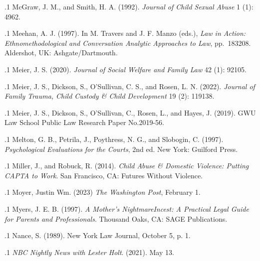 \documentclass[11pt, twoside]{article}
\begin{document}
{\p.1{%
McGraw, J. M., and Smith, H. A. (1992). 
\textit{Journal of Child Sexual Abuse} 1 (1): 49\ndash{}62.
}%

\p.1{%
Meehan, A. J. (1997).  In
M. Travers and J. F. Manzo (eds.), \textit{Law in Action: Ethnomethodological and
Conversation Analytic Approaches to Law}, pp.~183\ndash{}208. Aldershot, UK: Ashgate/Dartmouth.
}%

\p.1{%
Meier, J. S. (2020).  \textit{Journal of Social Welfare
and Family Law} 42 (1): 92\ndash{}105.
}%

\p.1{%
Meier, J. S., Dickson, S., O’Sullivan, C. S., and Rosen, L. N. (2022).  \textit{Journal of Family
Trauma, Child Custody \& Child Development} 19 (2): 119\ndash{}138.
}%

\p.1{%
Meier, J. S., Dickson, S., O’Sullivan, C., Rosen, L., and Hayes, J. (2019).  GWU
Law School Public Law Research Paper No.\@ 2019-56.
}%

\p.1{%
Melton, G. B., Petrila, J., Poythress, N. G., and Slobogin, C. (1997). \textit{Psychological
Evaluations for the Courts}, 2nd ed. New York: Guilford Press.
}%

\p.1{%
Miller, J., and Robuck, R. (2014). \textit{Child Abuse \& Domestic Violence: Putting CAPTA
to Work}. San Francisco, CA: Futures Without Violence.
}%

\p.1{%
Moyer, Justin Wm. (2023)  \textit{The Washington Post}, February 1.
}%

\p.1{%
Myers, J. E. B. (1997). \textit{A Mother’s Nightmare\mdash{}Incest: A Practical Legal Guide for
Parents and Professionals}. Thousand Oaks, CA: SAGE Publications.
}%

\p.1{%
Nance, S. (1989).  New York
Law Journal, October 5, p. 1.
}%

\p.1{%
\textit{NBC Nightly News with Lester Holt}. (2021). May 13.
}%

}
\end{document}
